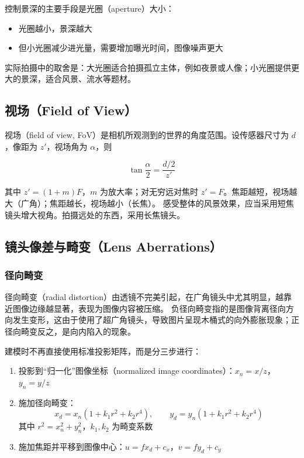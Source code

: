 \documentclass{ctexart}
\begin{document}
控制景深的主要手段是光圈（aperture）大小：

\begin{itemize}
    \item 光圈越小，景深越大
    \item 但小光圈减少进光量，需要增加曝光时间，图像噪声更大
\end{itemize}

实际拍摄中的取舍是：大光圈适合拍摄孤立主体，例如夜景或人像；小光圈提供更大的景深，适合风景、流水等题材。

\subsection{视场（Field of View）}

视场（field of view, FoV）是相机所观测到的世界的角度范围。设传感器尺寸为 $d$，像距为 $z'$，视场角为 $\alpha$，则

\[
\tan\frac{\alpha}{2} = \frac{d/2}{z'}
\]

其中 $z' = (1+m)F$，$m$ 为放大率；对无穷远对焦时 $z' = F$。焦距越短，视场越大（广角）；焦距越长，视场越小（长焦）。
感受整体的风景效果，应当采用短焦镜头增大视角。拍摄远处的东西，采用长焦镜头。

\subsection{镜头像差与畸变（Lens Aberrations）}

\subsubsection{径向畸变}

径向畸变（radial distortion）由透镜不完美引起，在广角镜头中尤其明显，越靠近图像边缘越显著，表现为图像内容被压缩。
负径向畸变指的是图像背离径向方向发生变形，这由于使用了超广角镜头，导致图片呈现木桶式的向外膨胀现象；正径向畸变反之，是向内陷入的现象。

建模时不再直接使用标准投影矩阵，而是分三步进行：

\begin{enumerate}
    \item 投影到“归一化”图像坐标（normalized image coordinates）：$x_n = x/z$，$y_n = y/z$
    \item 施加径向畸变：
    \[
    x_d = x_n\left(1 + k_1 r^2 + k_2 r^4\right), \qquad
    y_d = y_n\left(1 + k_1 r^2 + k_2 r^4\right)
    \]
    其中 $r^2 = x_n^2 + y_n^2$，$k_1, k_2$ 为畸变系数
    \item 施加焦距并平移到图像中心：$u = f x_d + c_x$，$v = f y_d + c_y$
\end{enumerate}
\end{document}
